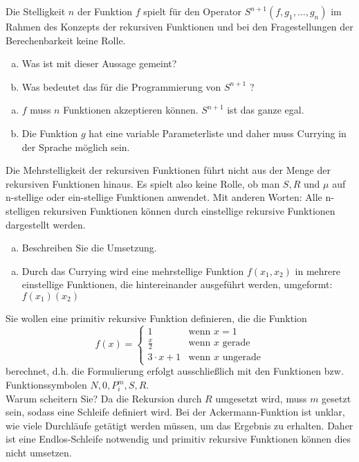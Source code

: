 \begin{card}
  Die Stelligkeit $n$ der Funktion $f$ spielt für den Operator $S^{n+1}(f, g_1, \ldots, g_n)$ im Rahmen des Konzepts der rekursiven Funktionen und bei den Fragestellungen der Berechenbarkeit keine Rolle.
  \begin{enumerate}[a)]
    \item Was ist mit dieser Aussage gemeint?
    \item Was bedeutet das für die Programmierung von $S^{n+1}$ ?
  \end{enumerate}
  \hr
  \begin{enumerate}[a)]
    \item $f$ muss $n$ Funktionen akzeptieren können. $S^{n+1}$ ist das ganze egal.
    \item Die Funktion $g$ hat eine variable Parameterliste und daher muss Currying in der Sprache möglich sein.
  \end{enumerate}
\end{card}

\begin{card}
  Die Mehrstelligkeit der rekursiven Funktionen führt nicht aus der Menge der rekursiven Funktionen hinaus. Es spielt also keine Rolle, ob man $S, R$ und $\mu$ auf n-stellige oder ein-stellige Funktionen anwendet. Mit anderen Worten: Alle n-stelligen rekursiven Funktionen können durch einstellige rekursive Funktionen dargestellt werden.
  \begin{enumerate}[a)]
    \item Beschreiben Sie die Umsetzung.
  \end{enumerate}
  \hr
  \begin{enumerate}[a)]
    \item Durch das Currying wird eine mehrstellige Funktion $f(x_1, x_2)$ in mehrere einstellige Funktionen, die
      hintereinander ausgeführt werden, umgeformt: $f(x_1)(x_2)$
  \end{enumerate}
\end{card}

\begin{card}
	Sie wollen eine primitiv rekursive Funktion definieren, die die Funktion
	\[
	f(x) =
	\begin{cases}
	1 & \text{wenn $x = 1$} \\
	  \frac{x}{2} & \text{wenn $x$ gerade} \\
	3 \cdot x + 1 &\text{wenn $x$ ungerade}
	\end{cases}
	\]
	berechnet, d.h. die Formulierung erfolgt ausschließlich mit den Funktionen bzw. Funktionssymbolen $N, 0, P^m_i , S, R$.\\
	Warum scheitern Sie?
  \hr
	Da die Rekursion durch $R$ umgesetzt wird, muss $m$ gesetzt sein, sodass eine Schleife definiert wird. Bei der Ackermann-Funktion ist unklar, wie viele Durchläufe getätigt werden müssen, um das Ergebnis zu erhalten. Daher ist eine Endlos-Schleife notwendig und primitiv rekursive Funktionen können dies nicht umsetzen.
\end{card}

